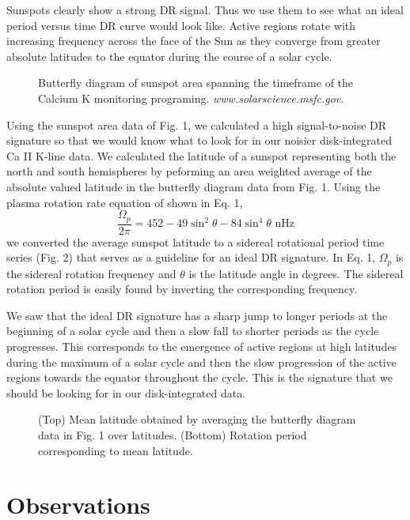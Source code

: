 \documentclass[preprint2]{aastex}
\begin{document}
Sunspots clearly show a strong DR signal. Thus we use them to see what an ideal period versus time DR curve would look like. Active regions rotate with increasing frequency across the face of the Sun as they converge from greater absolute latitudes to the equator during the course of a solar cycle.

\begin{figure}[H]
\caption{Butterfly diagram of sunspot area spanning the timeframe of the Calcium K monitoring programing.
{\it www.solarscience.msfc.gov}.\label{fig1}}
\end{figure}

Using the sunspot area data of Fig. 1, we calculated a high signal-to-noise DR signature so that we would know what to look for in our noisier disk-integrated Ca II K-line data. We calculated the latitude of a sunspot representing both the north and south hemispheres by peforming an area weighted average of the absolute valued latitude in the butterfly diagram data from Fig. 1. Using the plasma rotation rate equation of \cite{snod83} shown in Eq. 1,
\begin{equation}
\frac{\Omega_p}{2\pi}=452-49\sin ^2\theta - 84\sin ^4\theta \text{  nHz}
\end{equation}
we converted the average sunspot latitude to a sidereal rotational period time series (Fig. 2) that serves as a guideline for an ideal DR signature. In Eq. 1, $\Omega_p$ is the sidereal rotation frequency and $\theta$ is the latitude angle in degrees. The sidereal rotation period is easily found by inverting the corresponding frequency. 

We saw that the ideal DR signature has a sharp jump to longer periods at the beginning of a solar cycle and then a slow fall to shorter periods as the cycle progresses. This corresponds to the emergence of active regions at high latitudes during the maximum of a solar cycle and then the slow progression of the active regions towards the equator throughout the cycle. This is the signature that we should be looking for in our disk-integrated data.

\begin{figure}[H]
\caption{(Top) Mean latitude obtained by averaging the butterfly diagram data in Fig. 1 over latitudes. (Bottom) Rotation period corresponding to mean latitude.}
\end{figure}

\section{Observations}
\end{document}
